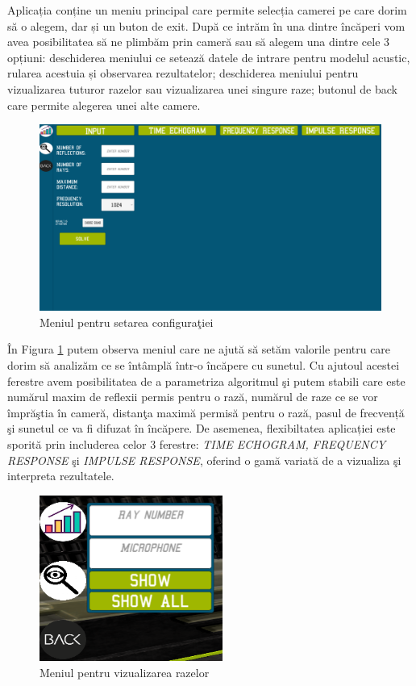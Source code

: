 	Aplicația conține un meniu principal care permite selecția camerei pe care dorim să o alegem, dar și un buton de exit. După ce intrăm în una dintre încăperi vom avea posibilitatea să ne plimbăm prin cameră sau să alegem una dintre cele 3 opțiuni: deschiderea meniului ce setează datele de intrare pentru modelul acustic, rularea acestuia și observarea rezultatelor; deschiderea meniului pentru vizualizarea tuturor razelor sau vizualizarea unei singure raze; butonul de back care permite alegerea unei alte camere.
	
	\begin{figure}[!htb]
		\centering
		\includegraphics[width=1\linewidth]{imagini/input.png}
		\caption{Meniul pentru setarea configura\c{t}iei}
		\label{inputFig}
	\end{figure}

	\^{I}n Figura \ref{inputFig} putem observa meniul care ne ajut\u{a} s\u{a} set\u{a}m valorile pentru care dorim s\u{a} analizăm ce se \^{i}nt\^{a}mpl\u{a} \^{i}ntr-o \^{i}nc\u{a}pere cu sunetul. Cu ajutoul acestei ferestre avem posibilitatea de a parametriza algoritmul \c{s}i putem stabili care este num\u{a}rul maxim de reflexii permis pentru o raz\u{a}, num\u{a}rul de raze ce se vor \^{i}mpr\u{a}\c{s}tia \^{i}n camer\u{a}, distan\c{t}a maxim\u{a} permis\u{a} pentru o raz\u{a}, pasul de frecvență \c{s}i sunetul ce va fi difuzat \^{i}n \^{i}nc\u{a}pere. De asemenea, flexibiltatea aplicației este sporită prin includerea celor 3 ferestre: \textit{TIME ECHOGRAM, FREQUENCY RESPONSE} \c{s}i \textit{IMPULSE RESPONSE}, oferind o gamă variată de a vizualiza \c{s}i interpreta rezultatele.
	 
	
	\begin{figure}[!htb]
		\centering
		\includegraphics[width=6cm]{imagini/rayMenu.png}
		\caption{Meniul pentru vizualizarea razelor}
		\label{rayMenu}
	\end{figure}

